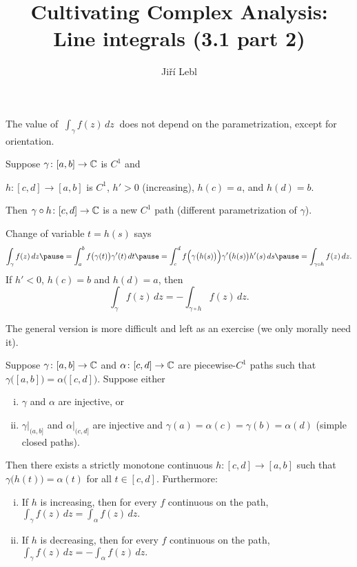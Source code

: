\documentclass[10pt,aspectratio=169]{beamer}
\author{Ji\v{r}\'i Lebl}
\institute[OSU]{%
Departemento pri Matematiko de Oklahoma {\^S}tata Universitato}
\title{Cultivating Complex Analysis:\\%
Line integrals (3.1 part 2)}
\date{}
\begin{document}
\begin{frame}
\titlepage
\end{frame}

\begin{frame}
The value of $~\int_\gamma f(z) \, dz~$ does not depend on the parametrization,
\pause
except for orientation.

\medskip
\pause

Suppose $\gamma \colon [a,b] \to {\mathbb{C}}$ is $C^1$ \pause and

$h \colon [c,d] \to [a,b]$ is $C^1$,
$h' > 0$ (increasing),
$h(c)=a$, and $h(d) = b$.

\medskip
\pause

Then $\gamma \circ h \colon [c,d] \to {\mathbb{C}}$ is a new $C^1$ path (different parametrization of
$\gamma$).

\medskip
\pause

Change of variable $t=h(s)$ says
\[
\int_{\gamma} f(z) \, dz
\pause
=
\int_a^b f\bigl( \gamma(t) \bigr) \gamma'(t) \, dt
\pause
 =
\int_c^d f\Bigl( \gamma\bigl(h(s)\bigr) \Bigr) \gamma'\bigl(h(s)\bigr) h'(s) \, ds
\pause
=
\int_{\gamma \circ h} f(z) \, dz.
\]
\pause
If $h' < 0$, $h(c)=b$ and $h(d)=a$, \pause then
\[
\int_{\gamma} f(z) \, dz =
- \int_{\gamma \circ h} f(z) \, dz.
\]
\end{frame}

\begin{frame}
The general version is more difficult and left as an exercise
(we only morally need it).

\pause

\begin{proposition}[Reparametrization]
Suppose $\gamma \colon [a,b] \to {\mathbb{C}}$ and $\alpha \colon [c,d] \to {\mathbb{C}}$ are
piecewise-$C^1$ paths such that
$\gamma\bigl([a,b]\bigr) = \alpha\bigl([c,d]\bigr)$.
Suppose either
\begin{enumerate}[(i)]
\item
$\gamma$ and $\alpha$ are injective, or
\item
$\gamma|_{(a,b]}$ and
$\alpha|_{(c,d]}$ are injective and 
$\gamma(a)=\alpha(c)=\gamma(b)=\alpha(d)$ (simple closed paths).
\end{enumerate}
\pause
Then there exists a strictly monotone continuous $h \colon [c,d] \to [a,b]$ such
that $\gamma\bigl(h(t)\bigr) = \alpha(t)$ for all $t \in [c,d]$.
\pause
Furthermore:
\begin{enumerate}[(i)]
\item
If $h$ is increasing, then for every $f$ continuous on the path,
$\displaystyle
\int_\gamma f(z) \, dz = \int_{\alpha} f(z) \, dz .
$
\item
If $h$ is decreasing, then for every $f$ continuous on the path,
$\displaystyle
\int_\gamma f(z) \, dz = - \int_{\alpha} f(z) \, dz .
$
\end{enumerate}
\end{proposition}
\end{frame}
\end{document}
